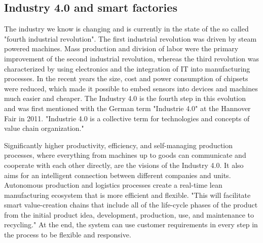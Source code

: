 \subsection{Industry 4.0 and smart factories}
The industry we know is changing and is currently in the state of the so called "fourth industrial revolution".
The first industrial revolution was driven by steam powered machines.
Mass production and division of labor were the primary improvement of the second industrial revolution, whereas the third revolution was characterized by using electronics and the integration of \ac{IT} into manufacturing processes.\autocite[cf.][p. 1]{Lom:2016}
In the recent years the size, cost and power consumption of chipsets were reduced, which made it possible to embed sensors into devices and machines much easier and cheaper.\autocite[cf.][p. 1]{Brito:2016}
The Industry 4.0 is the fourth step in this evolution and was first mentioned with the German term "Industrie 4.0" at the Hannover Fair in 2011.\autocite[cf.][p. 1]{Lom:2016}
"Industrie 4.0 is a collective term for technologies and concepts of value chain organization."\autocite[cf.][p. 11]{Her:2015}

Significantly higher productivity, efficiency, and self-managing production processes, where everything from machines up to goods can communicate and cooperate with each other directly, are the visions of the Industry 4.0.\autocite[cf.]{Lyd:2016}
It also aims for an intelligent connection between different companies and units.
Autonomous production and logistics processes create a real-time lean manufacturing ecosystem that is more efficient and flexible.\autocite[cf.]{Lyd:2016}
"This will facilitate smart value-creation chains that include all of the life-cycle phases of the product from the initial product idea, development, production, use, and maintenance to recycling."\autocite{Lyd:2016}
At the end, the system can use customer requirements in every step in the process to be flexible and responsive.\autocite[cf.]{Lyd:2016}


